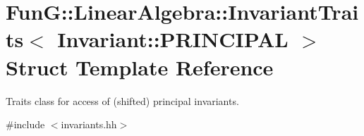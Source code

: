 \hypertarget{structFunG_1_1LinearAlgebra_1_1InvariantTraits_3_01Invariant_1_1PRINCIPAL_01_4}{\section{Fun\-G\-:\-:Linear\-Algebra\-:\-:Invariant\-Traits$<$ Invariant\-:\-:P\-R\-I\-N\-C\-I\-P\-A\-L $>$ Struct Template Reference}
\label{structFunG_1_1LinearAlgebra_1_1InvariantTraits_3_01Invariant_1_1PRINCIPAL_01_4}
}


Traits class for access of (shifted) principal invariants.  




{\ttfamily \#include $<$invariants.\-hh$>$}

